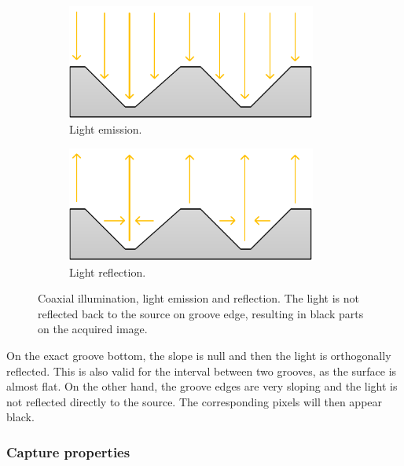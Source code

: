 \begin{figure}[!ht]
\centering
    \begin{subfigure}[t]{0.48\textwidth}
    \centering
    \includegraphics[width=0.9\textwidth]{images/irene-lum-emi}
    \caption{Light emission.}
    \label{fig:irenlumemi}
    \end{subfigure}
    \begin{subfigure}[t]{0.48\textwidth}
    \centering
    \includegraphics[width=0.9\textwidth]{images/irene-lum-reflect}
    \caption{Light reflection.}
    \label{fig:irenelumreflect}
    \end{subfigure}
    \caption[Coaxial illumination, light emission and reflection.]
    {Coaxial illumination, light emission and reflection. The light is not reflected back to the source on groove edge, resulting in black parts on the acquired image.}
    \label{fig:irenecoaxlum}
\end{figure}

On the exact groove bottom, the slope is null and then the light is orthogonally reflected. This is also valid for the interval between two grooves, as the surface is almost flat. On the other hand, the groove edges are very sloping and the light is not reflected directly to the source. The corresponding pixels will then appear black.

\subsubsection{Capture properties}

